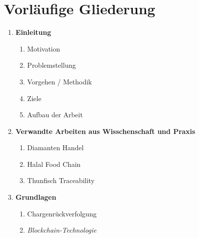 \section{Vorläufige Gliederung}
\begin{small}
  \begin{enumerate}
    \item \textbf{Einleitung}
    \begin{enumerate}[label*=\arabic*.]
      \item Motivation
      \item Problemstellung
      \item Vorgehen / Methodik
      \item Ziele
      \item Aufbau der Arbeit
    \end{enumerate}
    \item \textbf{Verwandte Arbeiten aus Wisschenschaft und Praxis}
    \begin{enumerate}[label*=\arabic*.]
      \item Diamanten Handel
      \item Halal Food Chain
      \item Thunfisch Traceability
    \end{enumerate}
    \item \textbf{Grundlagen}
    \begin{enumerate}[label*=\arabic*.]
      \item Chargenrückverfolgung
      \item \textit{Blockchain-Technologie}

\end{enumerate}
\end{enumerate}
\end{small}
